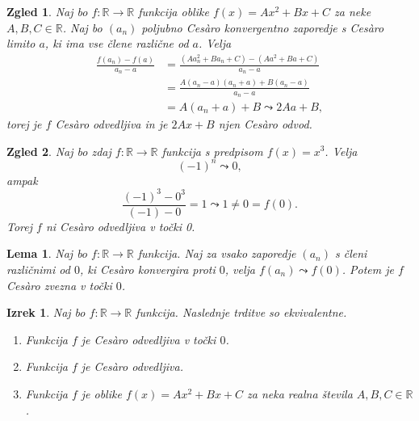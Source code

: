\documentclass{beamer}
\newtheorem{izrek}{Izrek}
\newtheorem{lema}{Lema}
\newtheorem{zgled}{Zgled}
\begin{document}
\begin{frame}
    \begin{zgled}
        \label{vseodv}
        Naj bo $f: \mathbb{R} \rightarrow \mathbb{R}$ funkcija oblike $f(x) = Ax^2 + Bx + C$ za neke $A, B, C \in \mathbb{R}$. Naj bo $(a_n)$ poljubno Ces\`{a}ro konvergentno zaporedje s Ces\`{a}ro limito $a$, ki ima vse člene različne od $a$. Velja 
        \begin{align*}
            \frac{f(a_n)-f(a)}{a_n-a} &= \frac{(Aa_n^2 + Ba_n + C)-(Aa^2 + Ba + C)}{a_n-a}\\
            &= \frac{A(a_n-a)(a_n+a) + B(a_n-a)}{a_n-a}\\
            &= A(a_n+a) + B \leadsto 2Aa + B,
        \end{align*}
        torej je $f$ Ces\`{a}ro odvedljiva in je $2Ax + B$ njen Ces\`{a}ro odvod.
    \end{zgled}
\end{frame}

\begin{frame}
    \begin{zgled}
        Naj bo zdaj $f: \mathbb{R} \rightarrow \mathbb{R}$ funkcija s predpisom $f(x) = x^3$. Velja 
        $$(-1)^n \leadsto 0,$$ 
        ampak 
        $$\frac{(-1)^3-0^3}{(-1)-0} = 1 \leadsto 1 \neq 0 = f(0).$$ 
        Torej $f$ ni Ces\`{a}ro odvedljiva v točki 0.
    \end{zgled}
\end{frame}

\begin{frame}
    \begin{lema}
        \label{lema}
        Naj bo $f: \mathbb{R} \rightarrow \mathbb{R}$ funkcija. Naj za vsako zaporedje $(a_n)$ s členi različnimi od $0$, ki Ces\`{a}ro konvergira proti $0$, velja $f(a_n) \leadsto f(0)$. Potem je $f$ Ces\`{a}ro zvezna v točki $0$.
    \end{lema}
\end{frame}

\begin{frame}
    \begin{izrek}
        \label{klasodv}
        Naj bo $f: \mathbb{R} \rightarrow \mathbb{R}$ funkcija. Naslednje trditve so ekvivalentne.
        \begin{enumerate}
            \item Funkcija $f$ je Ces\`{a}ro odvedljiva v točki $0$.
            \item Funkcija $f$ je Ces\`{a}ro odvedljiva.
            \item Funkcija $f$ je oblike $f(x) = Ax^2 + Bx + C$ za neka realna števila $A, B, C \in \mathbb{R}$.
        \end{enumerate}
    \end{izrek}
\end{frame}
\end{document}
